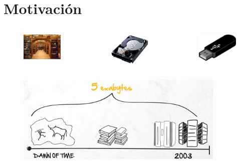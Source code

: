 
\section{Motivación}

{
	
	\begin{frame}{}			

		\kern -3mm
		\begin{columns}
			\begin{figure}[H]
				\centering
				\includegraphics[width=3cm]{./Images/libros.jpg}
			\end{figure}
			\begin{figure}[H]
				\centering
				\includegraphics[width=3cm]{./Images/disco-duro.jpg}
			\end{figure}
			\begin{figure}[H]
				\centering
				\includegraphics[width=3cm]{./Images/usb.png}
			\end{figure}
		\end{columns}

		\begin{figure}[H]
			\centering
			\includegraphics[width=10cm]{./Images/data.png}
		\end{figure}


	\end{frame}
}
			

